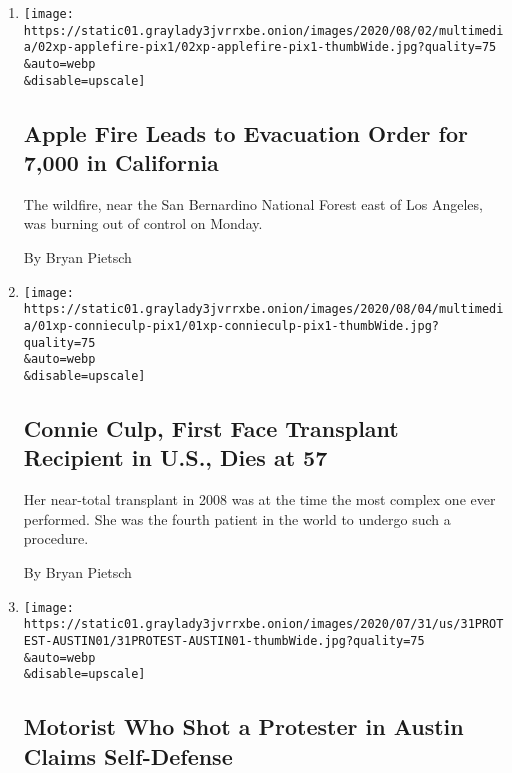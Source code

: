 \begin{enumerate}
\def\labelenumi{\arabic{enumi}.}
\item
  \href{/2020/08/02/us/apple-fire-ca.html}{}

  \texttt{[image: https://static01.graylady3jvrrxbe.onion/images/2020/08/02/multimedia/02xp-applefire-pix1/02xp-applefire-pix1-thumbWide.jpg?quality=75\\\&auto=webp\\\&disable=upscale]}

  \hypertarget{apple-fire-leads-to-evacuation-order-for-7000-in-california}{%
  \subsection{Apple Fire Leads to Evacuation Order for 7,000 in
  California}\label{apple-fire-leads-to-evacuation-order-for-7000-in-california}}

  The wildfire, near the San Bernardino National Forest east of Los
  Angeles, was burning out of control on Monday.

  By Bryan Pietsch
\item
  \href{/2020/08/01/us/Connie-culp-dead-face-transplant.html}{}

  \texttt{[image: https://static01.graylady3jvrrxbe.onion/images/2020/08/04/multimedia/01xp-connieculp-pix1/01xp-connieculp-pix1-thumbWide.jpg?quality=75\\\&auto=webp\\\&disable=upscale]}

  \hypertarget{connie-culp-first-face-transplant-recipient-in-us-dies-at-57}{%
  \subsection{Connie Culp, First Face Transplant Recipient in U.S., Dies
  at
  57}\label{connie-culp-first-face-transplant-recipient-in-us-dies-at-57}}

  Her near-total transplant in 2008 was at the time the most complex one
  ever performed. She was the fourth patient in the world to undergo
  such a procedure.

  By Bryan Pietsch
\item
  \href{/2020/07/31/us/austin-protest-shooting-foster-perry.html}{}

  \texttt{[image: https://static01.graylady3jvrrxbe.onion/images/2020/07/31/us/31PROTEST-AUSTIN01/31PROTEST-AUSTIN01-thumbWide.jpg?quality=75\\\&auto=webp\\\&disable=upscale]}

  \hypertarget{motorist-who-shot-a-protester-in-austin-claims-self-defense}{%
  \subsection{Motorist Who Shot a Protester in Austin Claims
  Self-Defense}\label{motorist-who-shot-a-protester-in-austin-claims-self-defense}}


\end{enumerate}
